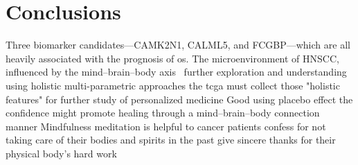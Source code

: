 \documentclass[
paper=landscape,
paper=160mm:90mm, %
fontsize=11pt, %
pagesize, %
parskip=half-, %
]{scrartcl} %
\theoremstyle{mythmstyle} %
\begin{document}








\section{Conclusions} %
\begin{outline}
\1 Three biomarker candidates---CAMK2N1, CALML5, and FCGBP---which are all heavily associated with the prognosis of \acrlong{os}.
\1 The microenvironment of HNSCC, influenced by the mind--brain--body axis~\cite{Hsiao2012}
    \2 further exploration and understanding using holistic multi-parametric approaches
    \2 the \acrshort{tcga} must collect those "holistic features" for further study of personalized medicine
\1 Good using placebo effect
    \2 the confidence might promote healing through a mind--brain--body connection manner
\1 Mindfulness meditation is helpful to cancer patients
    \2 confess for not taking care of their bodies and spirits in the past
    \2 give sincere thanks for their physical body's hard work
\end{outline}

\clearpage
\thispagestyle{empty} %
\end{document}
